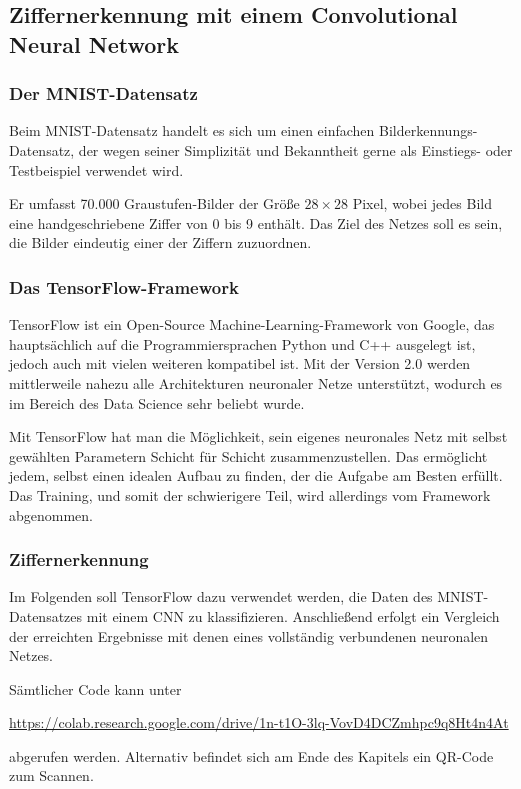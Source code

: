 \documentclass[12pt,a4]{article}
\begin{document}
\subsection{Ziffernerkennung mit einem Convolutional Neural Network}\label{sec:Application}
\subsubsection{Der MNIST-Datensatz}\label{sec:MNISTDataset}
Beim MNIST-Datensatz handelt es sich um einen einfachen Bilderkennungs-Datensatz, der wegen seiner Simplizität und Bekanntheit gerne als Einstiegs- oder Testbeispiel verwendet wird.

Er umfasst 70.000 Graustufen-Bilder der Größe $28 \times 28$ Pixel, wobei jedes Bild eine handgeschriebene Ziffer von 0 bis 9 enthält. Das Ziel des Netzes soll es sein, die Bilder eindeutig einer der Ziffern zuzuordnen.

\subsubsection{Das TensorFlow-Framework}\label{sec:TensorFlow}
TensorFlow ist ein Open-Source Machine-Learning-Framework von Google, das hauptsächlich auf die Programmiersprachen Python und C++ ausgelegt ist, jedoch auch mit vielen weiteren kompatibel ist. Mit der Version 2.0 werden mittlerweile nahezu alle Architekturen neuronaler Netze unterstützt, wodurch es im Bereich des Data Science sehr beliebt wurde.

Mit TensorFlow hat man die Möglichkeit, sein eigenes neuronales Netz mit selbst gewählten Parametern Schicht für Schicht zusammenzustellen. Das ermöglicht jedem, selbst einen idealen Aufbau zu finden, der die Aufgabe am Besten erfüllt. Das Training, und somit der schwierigere Teil, wird allerdings vom Framework abgenommen.

\subsubsection{Ziffernerkennung}
Im Folgenden soll TensorFlow dazu verwendet werden, die Daten des MNIST-Datensatzes mit einem CNN zu klassifizieren. Anschließend erfolgt ein Vergleich der erreichten Ergebnisse mit denen eines vollständig verbundenen neuronalen Netzes.

Sämtlicher Code kann unter
\begin{center}
\footnotesize\url{https://colab.research.google.com/drive/1n-t1O-3lq-VovD4DCZmhpc9q8Ht4n4At}
\end{center} 
abgerufen werden. Alternativ befindet sich am Ende des Kapitels ein QR-Code zum Scannen.
\end{document}
